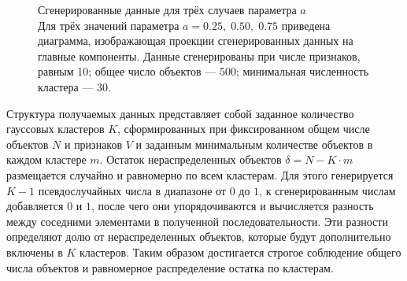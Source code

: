 \documentclass[12pt]{diploma}
\begin{document}
	\begin{figure}[h!] %
		\centering
		
		\caption{Сгенерированные данные для трёх случаев параметра $ a $
			\\ {\small Для трёх значений параметра $ a = 0.25,\;0.50,\;0.75$ приведена диаграмма, изображающая проекции сгенерированных данных на главные компоненты. Данные сгенерированы при числе признаков, равным 10; общее число объектов --- 500; минимальная численность кластера --- 30.}}
		\label{fig:svd-gen}
	\end{figure}
	
	Структура получаемых данных представляет собой заданное количество гауссовых кластеров $ K $, сформированных при фиксированном общем числе объектов $ N $ и признаков $ V $ и заданным минимальным количестве объектов в каждом кластере $ m $. Остаток нераспределенных объектов $ \delta = N-K \cdot m $ размещается случайно и равномерно по всем кластерам. Для этого генерируется $ K-1 $ псевдослучайных числа в диапазоне от $ 0 $ до $ 1 $, к сгенерированным числам добавляется $ 0 $ и $ 1 $, после чего они упорядочиваются и вычисляется разность между соседними элементами в полученной последовательности. Эти разности определяют долю от нераспределенных объектов, которые будут дополнительно включены в $ K $ кластеров. Таким образом достигается строгое соблюдение общего числа объектов и равномерное распределение остатка по кластерам. 
	
\end{document}

